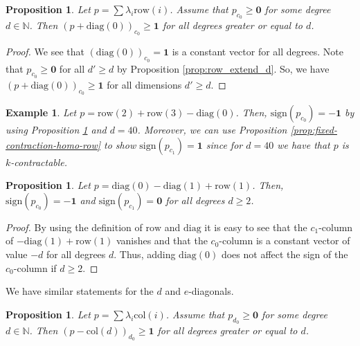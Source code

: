 \documentclass[11pt]{article}
\newtheorem{proposition}[theorem]{Proposition}
\newtheorem{example}[theorem]{Example}
\begin{document}
\begin{proposition}\label{prop:row_homo_zero_diag}
  Let \( p = \sum \lambda_i \mathrm{row}(i)\). Assume that \( p_{c_0} \geq \mathbf{0} \) for some degree \( d \in \mathbb{N} \). Then \( (p + \mathrm{diag}(0))_{c_0} \geq \mathbf 1 \) for all degrees greater or equal to \( d \).
\end{proposition}


\begin{proof}
  We see that \( (\mathrm{diag}(0))_{c_0} = \mathbf 1 \) is a constant vector for all degrees. Note that \( p_{c_0} \geq \mathbf 0 \) for all \( d' \geq d \) by Proposition \ref{prop:row_extend_d}. So, we have \( (p + \mathrm{diag}(0))_{c_0} \geq \mathbf 1 \) for all dimensions \( d' \geq d \).
\end{proof}



\begin{example}
  Let \( p = \mathrm{row}(2) + \mathrm{row}(3) - \mathrm{diag}(0) \).
  Then, \( \mathrm{sign}(p_{c_0}) = \mathbf{-1} \) by using Proposition \ref{prop:row_homo_zero_diag} and \( d = 40 \). Moreover, we can use Proposition \ref{prop:fixed-contraction-homo-row} to show \( \mathrm{sign}(p_{c_1}) = \mathbf{1} \) since for \( d = 40 \) we have that \( p \) is \( k \)-contractable.   
\end{example}

\begin{proposition}
  Let \( p = \mathrm{diag}(0) - \mathrm{diag}(1) + \mathrm{row}(1) \).
  Then, \( \mathrm{sign}(p_{c_0}) = \mathbf{-1} \) and \( \mathrm{sign}(p_{c_1}) = \mathbf{0} \) for all degrees \( d \geq 2 \).
\end{proposition}

\begin{proof}
  By using the definition of \( \mathrm{row} \) and \( \mathrm{diag} \) it is easy to see that the \( c_1 \)-column of \( - \mathrm{diag}(1) + \mathrm{row}(1) \) vanishes and that the \( c_0 \)-column is a constant vector of value \( -d \) for all degrees \( d \). Thus, adding \( \mathrm{diag}(0) \) does not affect the sign of the \( c_0 \)-column if \( d \geq 2 \).
\end{proof}

We have similar statements for the \( d \) and \( e \)-diagonals.

\begin{proposition}\label{prop:col_homo_d_zero_diag}
  Let \( p = \sum \lambda_i \mathrm{col}(i)\). Assume that \( p_{d_0} \geq \mathbf{0} \) for some degree \( d \in \mathbb{N} \). Then \( (p - \mathrm{col}(d))_{d_0} \geq \mathbf 1 \) for all degrees greater or equal to \( d \).
\end{proposition}
\end{document}
